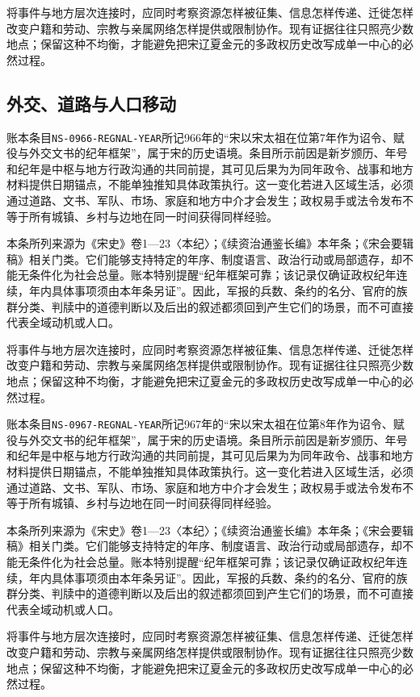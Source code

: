 将事件与地方层次连接时，应同时考察资源怎样被征集、信息怎样传递、迁徙怎样改变户籍和劳动、宗教与亲属网络怎样提供或限制协作。现有证据往往只照亮少数地点；保留这种不均衡，才能避免把宋辽夏金元的多政权历史改写成单一中心的必然过程。

\subsection{外交、道路与人口移动}

账本条目\texttt{NS-0966-REGNAL-YEAR}所记966年的“宋以宋太祖在位第7年作为诏令、赋役与外交文书的纪年框架”，属于宋的历史语境。条目所示前因是新岁颁历、年号和纪年是中枢与地方行政沟通的共同前提，其可见后果为为同年政令、战事和地方材料提供日期锚点，不能单独推知具体政策执行。这一变化若进入区域生活，必须通过道路、文书、军队、市场、家庭和地方中介才会发生；政权易手或法令发布不等于所有城镇、乡村与边地在同一时间获得同样经验。

本条所列来源为《宋史》卷1—23〈本纪〉；《续资治通鉴长编》本年条；《宋会要辑稿》相关门类。它们能够支持特定的年序、制度语言、政治行动或局部遗存，却不能无条件化为社会总量。账本特别提醒“纪年框架可靠；该记录仅确证政权纪年连续，年内具体事项须由本年条另证”。因此，军报的兵数、条约的名分、官府的族群分类、判牍中的道德判断以及后出的叙述都须回到产生它们的场景，而不可直接代表全域动机或人口。

将事件与地方层次连接时，应同时考察资源怎样被征集、信息怎样传递、迁徙怎样改变户籍和劳动、宗教与亲属网络怎样提供或限制协作。现有证据往往只照亮少数地点；保留这种不均衡，才能避免把宋辽夏金元的多政权历史改写成单一中心的必然过程。

账本条目\texttt{NS-0967-REGNAL-YEAR}所记967年的“宋以宋太祖在位第8年作为诏令、赋役与外交文书的纪年框架”，属于宋的历史语境。条目所示前因是新岁颁历、年号和纪年是中枢与地方行政沟通的共同前提，其可见后果为为同年政令、战事和地方材料提供日期锚点，不能单独推知具体政策执行。这一变化若进入区域生活，必须通过道路、文书、军队、市场、家庭和地方中介才会发生；政权易手或法令发布不等于所有城镇、乡村与边地在同一时间获得同样经验。

本条所列来源为《宋史》卷1—23〈本纪〉；《续资治通鉴长编》本年条；《宋会要辑稿》相关门类。它们能够支持特定的年序、制度语言、政治行动或局部遗存，却不能无条件化为社会总量。账本特别提醒“纪年框架可靠；该记录仅确证政权纪年连续，年内具体事项须由本年条另证”。因此，军报的兵数、条约的名分、官府的族群分类、判牍中的道德判断以及后出的叙述都须回到产生它们的场景，而不可直接代表全域动机或人口。

将事件与地方层次连接时，应同时考察资源怎样被征集、信息怎样传递、迁徙怎样改变户籍和劳动、宗教与亲属网络怎样提供或限制协作。现有证据往往只照亮少数地点；保留这种不均衡，才能避免把宋辽夏金元的多政权历史改写成单一中心的必然过程。

